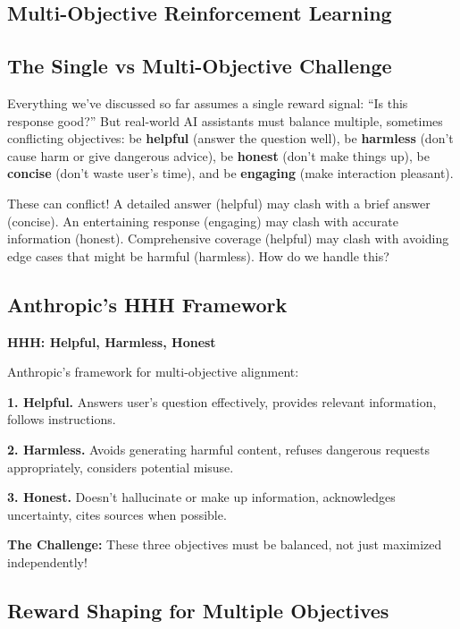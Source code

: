 \begin{chapterenv}

\chapter{Multi-Objective Reinforcement Learning}

\section{The Single vs Multi-Objective Challenge}

Everything we've discussed so far assumes a single reward signal: ``Is this response good?'' But real-world AI assistants must balance multiple, sometimes conflicting objectives: be \textbf{helpful} (answer the question well), be \textbf{harmless} (don't cause harm or give dangerous advice), be \textbf{honest} (don't make things up), be \textbf{concise} (don't waste user's time), and be \textbf{engaging} (make interaction pleasant).

These can conflict! A detailed answer (helpful) may clash with a brief answer (concise). An entertaining response (engaging) may clash with accurate information (honest). Comprehensive coverage (helpful) may clash with avoiding edge cases that might be harmful (harmless). How do we handle this?

\section{Anthropic's HHH Framework}

\begin{infobox}
\textbf{HHH: Helpful, Harmless, Honest}

Anthropic's framework for multi-objective alignment:

\textbf{1. Helpful.} Answers user's question effectively, provides relevant information, follows instructions.

\textbf{2. Harmless.} Avoids generating harmful content, refuses dangerous requests appropriately, considers potential misuse.

\textbf{3. Honest.} Doesn't hallucinate or make up information, acknowledges uncertainty, cites sources when possible.

\textbf{The Challenge:} These three objectives must be balanced, not just maximized independently!
\end{infobox}

\section{Reward Shaping for Multiple Objectives}


\end{chapterenv}
